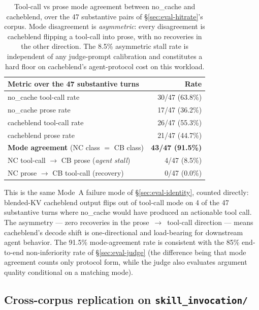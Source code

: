 \begin{table}[h]
\small
\centering
\begin{tabular}{lr}
\toprule
Metric over the 47 substantive turns & Rate \\
\midrule
no\_cache tool-call rate              & 30/47 (63.8\%) \\
no\_cache prose rate                  & 17/47 (36.2\%) \\
cacheblend tool-call rate             & 26/47 (55.3\%) \\
cacheblend prose rate                 & 21/47 (44.7\%) \\
\midrule
\textbf{Mode agreement} (NC class $=$ CB class) & \textbf{43/47 (91.5\%)} \\
NC tool-call $\to$ CB prose (\emph{agent stall}) & 4/47 (8.5\%) \\
NC prose $\to$ CB tool-call (recovery) & 0/47 (0.0\%) \\
\bottomrule
\end{tabular}
\caption{Tool-call vs prose mode agreement between no\_cache and
cacheblend, over the 47 substantive pairs of \S\ref{sec:eval-hitrate}'s
corpus. Mode disagreement is \emph{asymmetric}: every disagreement is
cacheblend flipping a tool-call into prose, with no recoveries in the
other direction. The 8.5\% asymmetric stall rate is independent of any
judge-prompt calibration and constitutes a hard floor on cacheblend's
agent-protocol cost on this workload.}
\label{tab:tool-call-mode}
\end{table}

This is the same Mode~A failure mode of \S\ref{sec:eval-identity},
counted directly: blended-KV cacheblend output flips out of tool-call
mode on 4 of the 47 substantive turns where no\_cache would have
produced an actionable tool call. The asymmetry --- zero recoveries
in the prose~$\to$~tool-call direction --- means cacheblend's decode
shift is one-directional and load-bearing for downstream agent
behavior. The 91.5\% mode-agreement rate is consistent with the 85\%
end-to-end non-inferiority rate of \S\ref{sec:eval-judge} (the
difference being that mode agreement counts only protocol form, while
the judge also evaluates argument quality conditional on a matching
mode).

\subsection{Cross-corpus replication on \texttt{skill\_invocation/}}
\label{sec:eval-cross-corpus}

